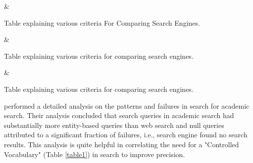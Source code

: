 \begin{table}[h]
    \label{table\arabic{tablecounter}}
            {\Criteria & \Meaning}
            \centering
            \caption{\label{tablecounter}Table explaining various criteria For Comparing Search Engines. }
\end{table}

\begin{table}[h]
    \label{table\arabic{tablecounter}}
            {\Criteria & \Meaning}
            \centering
            \caption{\label{tablecounter}Table explaining various criteria for comparing search engines. }
\end{table}

\begin{table}[h]
    \label{table\arabic{tablecounter}}
            {\Criteria & \Meaning}
            \centering
            \caption{\label{tablecounter}Table explaining various criteria for comparing search engines. }
\end{table}


\cite{li2017investigating} performed a detailed analysis on the patterns and failures in search for academic search. 
Their analysis concluded that search queries in academic search had substantially more entity-based queries than web search and null queries attributed to a significant fraction of failures, i.e., search engine found no search results. 
This analysis is quite helpful in correlating the need for a "Controlled Vocabulary" (Table \ref{table1}) in search to improve precision. 

